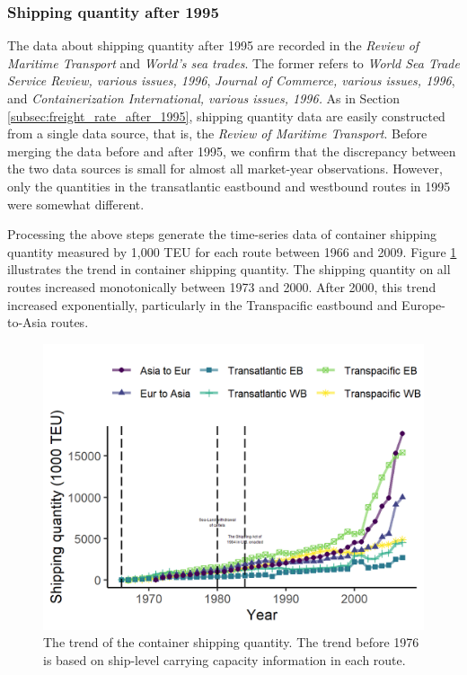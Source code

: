 \subsubsection{Shipping quantity after 1995}
The data about shipping quantity after 1995 are recorded in the  \textit{Review of Maritime Transport} and \textit{World's sea trades}. The former refers to \textit{World Sea Trade Service Review, various issues, 1996}, \textit{Journal of Commerce, various issues, 1996}, and \textit{Containerization International, various issues, 1996.} As in Section \ref{subsec:freight_rate_after_1995}, shipping quantity data are easily constructed from a single data source, that is, the  \textit{Review of Maritime Transport}. Before merging the data before and after 1995, we confirm that the discrepancy between the two data sources is small for almost all market-year observations. However, only the quantities in the transatlantic eastbound and westbound routes in 1995 were somewhat different.

Processing the above steps generate the time-series data of container shipping quantity measured by 1,000 TEU for each route between 1966 and 2009. Figure \ref{fg:container_shipping_quantity_each_route} illustrates the trend in container shipping quantity. The shipping quantity on all routes increased monotonically between 1973 and 2000. After 2000, this trend increased exponentially, particularly in the Transpacific eastbound and Europe-to-Asia routes.

\begin{figure}[!ht]
\begin{center}
\includegraphics[height = 0.5\textheight]{figuretable/container_shipping_quantity_each_route.png}

\end{center}
\caption{The trend of the container shipping quantity. The trend before 1976 is based on ship-level carrying capacity information in each route.}
\label{fg:container_shipping_quantity_each_route}
\end{figure}


